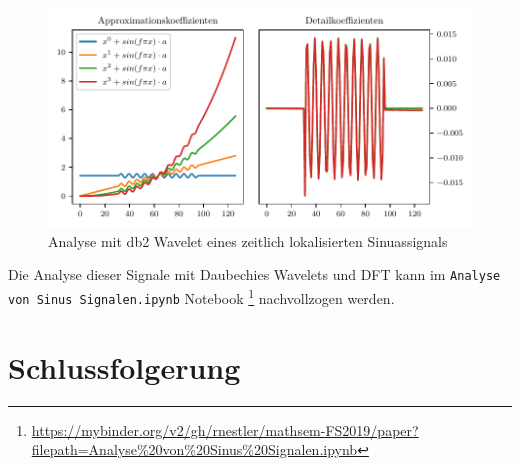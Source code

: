 \begin{refsection}
\begin{figure}
    \centering
    \includegraphics{papers/polynomials/images/polynomials_sin_padded_db2.pdf}
    \caption{Analyse mit db2 Wavelet eines zeitlich lokalisierten Sinuassignals\label{polynomials:sin:padded}}
\end{figure}

Die Analyse dieser Signale mit Daubechies Wavelets und DFT kann im
\texttt{Analyse von Sinus Signalen.ipynb} Notebook%
\footnote{\url{https://mybinder.org/v2/gh/rnestler/mathsem-FS2019/paper?filepath=Analyse\%20von\%20Sinus\%20Signalen.ipynb}}
nachvollzogen werden.

\section{Schlussfolgerung}

\printbibliography[heading=subbibliography]
\end{refsection}
